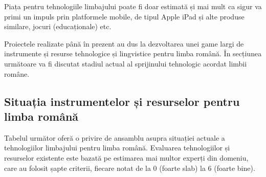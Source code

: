 \begin{multicols}{2}
Piața pentru tehnologiile limbajului poate fi doar estimată și mai mult ca sigur va primi un impuls prin platformele mobile, de tipul Apple iPad și alte produse similare, jocuri (educaționale) etc.

Proiectele realizate până în prezent au dus la dezvoltarea unei game largi de instrumente și resurse tehnologice și lingvistice pentru limba română. În secțiunea următoare va fi discutat stadiul actual al sprijinului tehnologic acordat limbii române.

\subsection{Situația instrumentelor și resurselor pentru limba română}

Tabelul următor oferă o privire de ansamblu asupra situației actuale a tehnologiilor limbajului pentru limba română. Evaluarea tehnologiilor și resurselor existente este bazată pe estimarea mai multor experți din domeniu, care au folosit șapte criterii, fiecare notat de la 0 (foarte slab) la 6 (foarte bine).


\end{multicols}
